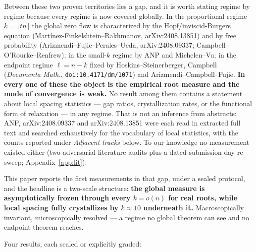\documentclass[11pt]{article}
\begin{document}
Between these two proven territories lies a gap, and it is worth stating regime by regime
because every regime is now covered globally. In the proportional regime $k=\lfloor tn\rfloor$
the global zero flow is characterized by the Hopf/inviscid-Burgers equation
(Mart\'inez-Finkelshtein--Rakhmanov, arXiv:2408.13851) and by free probability
(Arizmendi--Fujie--Perales--Ueda, arXiv:2408.09337; Campbell--O'Rourke--Renfrew); in the
small-$k$ regime by ANP and Michelen--Vu; in the endpoint regime $\ell=n-k$ fixed by
Hoskins--Steinerberger, Campbell (\emph{Documenta Math.}, \texttt{doi:10.4171/dm/1071}) and
Arizmendi--Campbell--Fujie. \textbf{In every one of these the object is the empirical root
measure and the mode of convergence is weak.} No result among them contains a statement about
local spacing statistics --- gap ratios, crystallization rates, or the functional form of
relaxation --- in any regime. That is not an inference from abstracts: ANP, arXiv:2408.09337
and arXiv:2408.13851 were each read in extracted full text and searched exhaustively for the
vocabulary of local statistics, with the counts reported under \emph{Adjacent tracks} below. To
our knowledge no measurement existed either (two adversarial literature audits plus a dated
submission-day re-sweep; Appendix~\ref{app:lit}).

This paper reports the first measurements in that gap, under a sealed protocol, and the
headline is a two-scale structure: \textbf{the global measure is asymptotically frozen through
every $k=o(n)$ for real roots, while local spacing fully crystallizes by $k\approx 10$
underneath it.} Macroscopically invariant, microscopically resolved --- a regime no global
theorem can see and no endpoint theorem reaches.

Four results, each sealed or explicitly graded:
\end{document}
